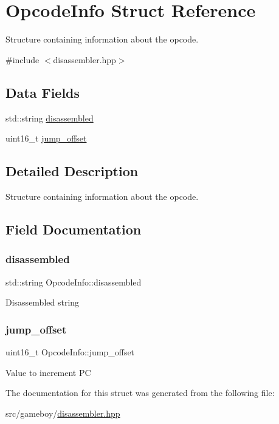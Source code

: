 \hypertarget{structOpcodeInfo}{}\section{Opcode\+Info Struct Reference}
\label{structOpcodeInfo}


Structure containing information about the opcode.  




{\ttfamily \#include $<$disassembler.\+hpp$>$}

\subsection*{Data Fields}
\begin{DoxyCompactItemize}
\item 
std\+::string \mbox{\hyperlink{structOpcodeInfo_ad80d1e93494c431c7313342acd628a3b}{disassembled}}
\item 
uint16\+\_\+t \mbox{\hyperlink{structOpcodeInfo_a78d68eb2466e5570afba30ee539197aa}{jump\+\_\+offset}}
\end{DoxyCompactItemize}


\subsection{Detailed Description}
Structure containing information about the opcode. 

\subsection{Field Documentation}
\mbox{\label{structOpcodeInfo_ad80d1e93494c431c7313342acd628a3b}} 
\subsubsection{\texorpdfstring{disassembled}{disassembled}}
{\footnotesize\ttfamily std\+::string Opcode\+Info\+::disassembled}

Disassembled string \mbox{\label{structOpcodeInfo_a78d68eb2466e5570afba30ee539197aa}} 
\subsubsection{\texorpdfstring{jump\+\_\+offset}{jump\_offset}}
{\footnotesize\ttfamily uint16\+\_\+t Opcode\+Info\+::jump\+\_\+offset}

Value to increment PC 

The documentation for this struct was generated from the following file\+:\begin{DoxyCompactItemize}
\item 
src/gameboy/\mbox{\hyperlink{disassembler_8hpp}{disassembler.\+hpp}}\end{DoxyCompactItemize}
